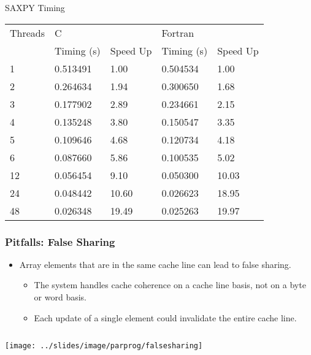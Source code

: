 \documentclass[10pt,t]{beamer}
\begin{document}
\begin{frame}{SAXPY Timing}
  \begin{exampleblock}{}
    \begin{center}
      \begin{tabular}{|b|b|b|b|b|}
        \hline
        \rowcolor{lublue}Threads & \multicolumn{2}{b|}{C} & \multicolumn{2}{b|}{Fortran} \\
        \cline{2-5}
        \rowcolor{lublue}& Timing (s) & Speed Up & Timing (s) & Speed Up \\
        \hline
        1 & 0.513491  &  1.00  & 0.504534  &   1.00 \\
        2 & 0.264634  &  1.94  & 0.300650  &   1.68 \\
        3 & 0.177902  &  2.89  & 0.234661  &   2.15 \\
        4 & 0.135248  &  3.80  & 0.150547  &   3.35 \\
        5 & 0.109646  &  4.68  & 0.120734  &   4.18 \\
        6 & 0.087660  &  5.86  & 0.100535  &   5.02 \\
        12 & 0.056454 &  9.10  & 0.050300  &  10.03 \\
        24 & 0.048442 & 10.60  & 0.026623  &  18.95 \\
        48 & 0.026348 & 19.49  & 0.025263  &  19.97 \\
        \hline
      \end{tabular}
    \end{center}
    \end{exampleblock}
\end{frame}

\begin{frame}[fragile]
  \frametitle{Pitfalls: False Sharing}
  \begin{itemize}
    \item Array elements that are in the same cache line can lead to false sharing.
    \begin{itemize}
      \item The system handles cache coherence on a cache line basis, not on a byte or word basis.
      \item Each update of a single element could invalidate the entire cache line.
    \end{itemize}
  \end{itemize}
  \begin{columns}
    \begin{center}
      \texttt{[image: ../slides/image/parprog/falsesharing]}
    \end{center}
    \begin{exampleblock}{}
      
    \end{exampleblock}
  \end{columns}
\end{frame}
\end{document}

